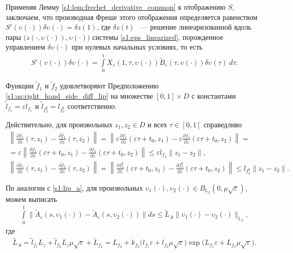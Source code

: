 \documentclass[../main.tex]{subfiles}
\begin{document}
Применяя Лемму \ref{s1:lem:frechet_derivative_common} к отображению $S$, заключаем, что производная Фреше этого отображения определяется равенством $ S'(\upsilon(\cdot))\delta \upsilon(\cdot) = \delta z(1)$, где $\delta z(t)$ ~--- решение линеаризованной вдоль пары $\big( z(\cdot,\upsilon(\cdot)),\upsilon(\cdot)\big) $ системы \eqref{s1:eps_linearized}, порожденное управлением $\delta \upsilon(\cdot)$ при нулевых начальных условиях, то есть
\begin{gather*}
	S'(\upsilon(\cdot))\delta \upsilon(\cdot) = \int\limits_0^1 X_{\varepsilon}(1, \tau, \upsilon(\cdot)) \widetilde{B}_{\varepsilon}(\tau, \upsilon(\cdot)) \delta\upsilon(\tau)\ d\tau. 
\end{gather*}
 
Функции $\widetilde{f}_1$ и $\widetilde{f}_2$ удовлетворяют Предположению \ref{s1:as:right_hand_side_diff_lip} на множестве $[0, 1]\times D$ с константами $\widetilde{l}_{f_1} = \varepsilon l_{f_1} $ и $\widetilde{l}_{f_2^k} = l_{f_2^k} $ соответственно. 

Действительно, для произвольных $z_1, z_2 \in D$ и всех $\tau \in [0, 1]$ справедливо
\begin{gather*}
	 \left\| \frac{\partial \widetilde{f}_1}{\partial z}(\tau, z_1) - \frac{\partial \widetilde{f}_1}{\partial z}(\tau, z_2) \right\| = 
	 \left\| \varepsilon \frac{\partial f_1}{\partial z}(\varepsilon \tau + t_0, z_1) - \varepsilon \frac{\partial f_1}{\partial z}(\varepsilon \tau + t_0, z_2) \right\| = \\ =
	 \varepsilon \left\| \frac{\partial f_1}{\partial z}(\varepsilon \tau + t_0, z_1) - \frac{\partial f_1}{\partial z}(\varepsilon \tau + t_0, z_2) \right\| 
	 \leqslant \varepsilon l_{f_1} \| z_1 - z_2\|, \\
	 \left\| \frac{\partial \widetilde{f}_2}{\partial z}(\tau,z_1) - \frac{\partial \widetilde{f}_2}{\partial z}(\tau,z_2) \right\| = 
	\left\| \frac{\partial f_2^k}{\partial z}(\varepsilon \tau + t_0,z_1) - \frac{\partial f_2^k}{\partial z}(\varepsilon \tau + t_0,z_2) \right\| 
	\leqslant l_{f_2^k} \| z_1 - z_2\|.
\end{gather*}
 
По аналогии с \eqref{s1:lip_a}, для произвольных $ \upsilon_1(\cdot), \upsilon_2(\cdot) \in B_{\mathbb{L}_2}(0,\mu\sqrt{\varepsilon})$, можем выписать
\begin{gather*}
 \int\limits_{0}^{1} \|\widetilde{A}_{\varepsilon}(s, \upsilon_1(\cdot)) - \widetilde{A}_{\varepsilon}(s, \upsilon_2(\cdot)) \| ds \leqslant \widetilde{L}_A \| \upsilon_1(\cdot) - \upsilon_2(\cdot) \|_{\mathbb{L}_2},
\end{gather*}
 где 
\begin{gather*}%
 \widetilde{L}_A = \widetilde{l}_{f_1} L_z + \widetilde{l}_{f_2} L_z \mu \sqrt{\varepsilon} + \widetilde{L}_{f_2} = 
 L_{f_2} + k_{f_2} \Big( l_{f_1} \varepsilon + l_{f_2} \mu \sqrt{\varepsilon} \Big) \exp\big( L_{f_1} \varepsilon + L_{f_2} \mu \sqrt{\varepsilon} \big).
 \end{gather*}
 
\end{document}
